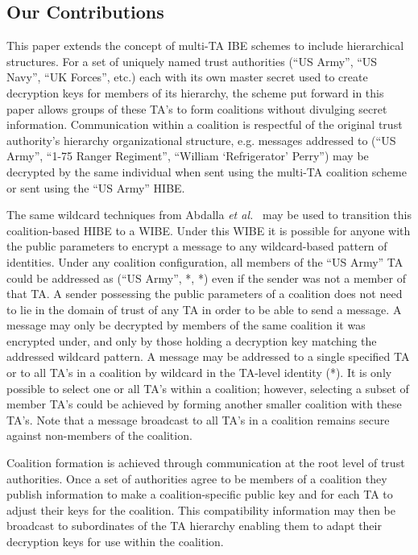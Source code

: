 \documentclass[10pt]{llncs}
\begin{document}
\subsection{Our Contributions}


This paper extends the concept of multi-TA IBE schemes to include
hierarchical structures. For a set of uniquely named trust
authorities (``US Army'', ``US Navy'', ``UK Forces'', etc.) each
with its own master secret used to create decryption keys for
members of its hierarchy, the scheme put forward in this paper
allows groups of these TA's to form coalitions without divulging
secret information. Communication within a coalition is respectful
of the original trust authority's hierarchy organizational
structure, e.g. messages addressed to (``US Army'', ``1-75 Ranger
Regiment'', ``William `Refrigerator' Perry'') may be decrypted by
the same individual when sent using the multi-TA coalition scheme or
sent using the ``US Army'' HIBE.

The same wildcard techniques from Abdalla \emph{et
al.}~\cite{Abdalla06} may be used to transition this coalition-based
HIBE to a WIBE. Under this WIBE it is possible for anyone with the
public parameters to encrypt a message to any wildcard-based pattern
of identities. Under any coalition configuration, all members of the
``US Army'' TA could be addressed as (``US Army'', *, *) even if the
sender was not a member of that TA. A sender possessing the public
parameters of a coalition does not need to lie in the domain of
trust of any TA in order to be able to send a message. A message may
only be decrypted by members of the same coalition it was encrypted
under, and only by those holding a decryption key matching the
addressed wildcard pattern. A message may be addressed to a single
specified TA or to all TA's in a coalition by wildcard in the
TA-level identity (*). It is only possible to select one or all TA's
within a coalition; however, selecting a subset of member TA's could
be achieved by forming another smaller coalition with these TA's.
Note that a message broadcast to all TA's in a coalition remains
secure against non-members of the coalition.

Coalition formation is achieved through communication at the root
level of trust authorities. Once a set of authorities agree to be
members of a coalition they publish information to make a
coalition-specific public key and for each TA to adjust their keys
for the coalition.  This compatibility information may then be
broadcast to subordinates of the TA hierarchy enabling them to adapt
their decryption keys for use within the coalition.
\end{document}
